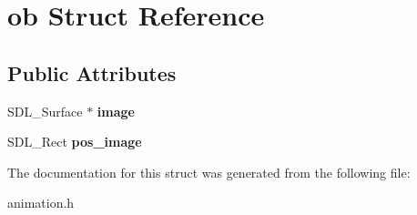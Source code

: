 \hypertarget{structob}{}\section{ob Struct Reference}
\label{structob}
\subsection*{Public Attributes}
\begin{DoxyCompactItemize}
\item 
\mbox{\label{structob_aaa6fac7758a0f17a781efe23c428b405}} 
S\+D\+L\+\_\+\+Surface $\ast$ {\bfseries image}
\item 
\mbox{\label{structob_a369abfeb66e619e81cce04fc3d6e626e}} 
S\+D\+L\+\_\+\+Rect {\bfseries pos\+\_\+image}
\end{DoxyCompactItemize}


The documentation for this struct was generated from the following file\+:\begin{DoxyCompactItemize}
\item 
animation.\+h\end{DoxyCompactItemize}
